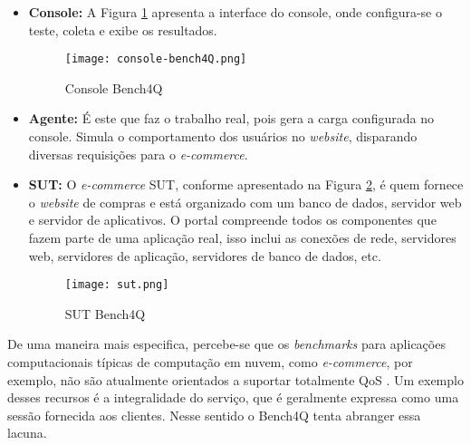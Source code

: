\begin{itemize}
	
	\item \textbf{Console:} A Figura \ref{fig:console-bench4q} apresenta a interface do console, onde configura-se o teste, coleta e exibe os resultados. 
	
	\begin{figure}[!htb]
		\centering
		\texttt{[image: console-bench4Q.png]}
		\caption{Console Bench4Q}
		\label{fig:console-bench4q}
	\end{figure}
	
	\item \textbf{Agente:} É este que faz o trabalho real, pois gera a carga configurada no console. Simula o comportamento dos usuários no \textit{website}, disparando diversas requisições para o \textit{e-commerce}. 
	
	\item \textbf{SUT:} O \textit{e-commerce} SUT, conforme apresentado na Figura \ref{fig:sut},  é quem fornece o \textit{website} de compras e está organizado com um banco de dados, servidor web e servidor de aplicativos. O portal compreende todos os componentes que fazem parte de uma aplicação real, isso inclui as conexões de rede, servidores web, servidores de aplicação, servidores de banco de dados, etc.
	
	\begin{figure}[htb]
		\centering
		\texttt{[image: sut.png]}
		\caption{SUT Bench4Q}
		\label{fig:sut}
	\end{figure}
	
\end{itemize}

De uma maneira mais especifica, percebe-se que os \textit{benchmarks} para aplicações computacionais típicas de computação em nuvem, como \textit{e-commerce}, por exemplo, não são atualmente orientados a suportar totalmente QoS %
\cite{Zhang2011}. Um exemplo desses recursos é a integralidade do serviço, que é geralmente expressa como uma sessão fornecida aos clientes. Nesse sentido o Bench4Q tenta abranger essa lacuna.


